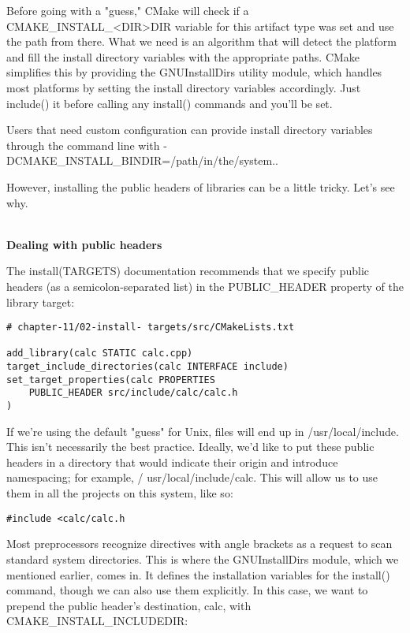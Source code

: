 Before going with a "guess," CMake will check if a CMAKE\_INSTALL\_<DIR>DIR variable for this artifact type was set and use the path from there. What we need is an algorithm that will detect the platform and fill the install directory variables with the appropriate paths. CMake simplifies this by providing the GNUInstallDirs utility module, which handles most platforms by setting the install directory variables accordingly. Just include() it before calling any install() commands and you'll be set.

Users that need custom configuration can provide install directory variables through the command line with -DCMAKE\_INSTALL\_BINDIR=/path/in/the/system..

However, installing the public headers of libraries can be a little tricky. Let's see why.

\hspace*{\fill} \\ %
\noindent
\textbf{Dealing with public headers}

The install(TARGETS) documentation recommends that we specify public headers (as a semicolon-separated list) in the PUBLIC\_HEADER property of the library target:

\begin{lstlisting}[style=styleCMake]
# chapter-11/02-install- targets/src/CMakeLists.txt

add_library(calc STATIC calc.cpp)
target_include_directories(calc INTERFACE include)
set_target_properties(calc PROPERTIES
	PUBLIC_HEADER src/include/calc/calc.h
)
\end{lstlisting}

If we're using the default "guess" for Unix, files will end up in /usr/local/include. This isn't necessarily the best practice. Ideally, we'd like to put these public headers in a directory that would indicate their origin and introduce namespacing; for example, / usr/local/include/calc. This will allow us to use them in all the projects on this system, like so:

\begin{lstlisting}[style=styleCXX]
#include <calc/calc.h
\end{lstlisting}

Most preprocessors recognize directives with angle brackets as a request to scan standard system directories. This is where the GNUInstallDirs module, which we mentioned earlier, comes in. It defines the installation variables for the install() command, though we can also use them explicitly. In this case, we want to prepend the public header's destination, calc, with CMAKE\_INSTALL\_INCLUDEDIR:

